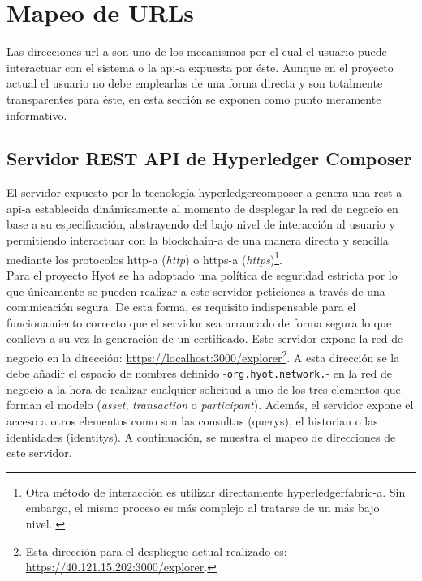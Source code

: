 \documentclass[12pt,a4paper, twoside]{report}
\begin{document}
	\section{Mapeo de URLs}
		
	Las direcciones \gls{url-a} son uno de los mecanismos por el cual el usuario puede interactuar con el sistema o la \gls{api-a} expuesta por éste. Aunque en el proyecto actual el usuario no debe emplearlas de una forma directa y son totalmente transparentes para éste, en esta sección se exponen como punto meramente informativo.
		
	\subsection{Servidor REST API de Hyperledger Composer}
		
	El servidor expuesto por la tecnología \gls{hyperledgercomposer-a} genera una \gls{rest-a} \gls{api-a} establecida dinámicamente al momento de desplegar la red de negocio en base a su especificación, abstrayendo del bajo nivel de interacción al usuario y permitiendo interactuar con la \gls{blockchain-a} de una manera directa y sencilla mediante los protocolos \gls{http-a} (\textit{\gls{http}}) o \gls{https-a} (\textit{\gls{https}})\footnote{Otra método de interacción es utilizar directamente \gls{hyperledgerfabric-a}. Sin embargo, el mismo proceso es más complejo al tratarse de un más bajo nivel..}. \\
	
	Para el proyecto Hyot se ha adoptado una política de seguridad estricta por lo que únicamente se pueden realizar a este servidor peticiones a través de una comunicación segura. De esta forma, es requisito indispensable para el funcionamiento correcto que el servidor sea arrancado de forma segura lo que conlleva a su vez la generación de un certificado. Este servidor expone la red de negocio en la dirección: \url{https://localhost:3000/explorer}\footnote{Esta dirección para el despliegue actual realizado es: \url{https://40.121.15.202:3000/explorer}.}. A esta dirección se la debe añadir el espacio de nombres definido -\texttt{org.hyot.network.}- en la red de negocio a la hora de realizar cualquier solicitud a uno de los tres elementos que forman el modelo (\textit{\gls{asset}}, \textit{\gls{transaction}} o \textit{\gls{participant}}). Además, el servidor expone el acceso a otros elementos como son las consultas (\glspl{query}), el \gls{historian} o las identidades (\glspl{identity}). A continuación, se muestra el mapeo de direcciones de este servidor. \\
			  
\end{document}
